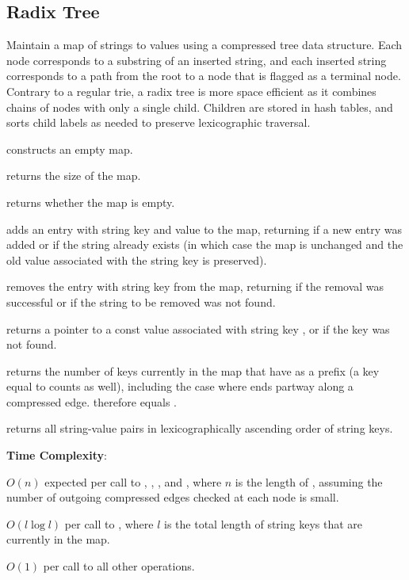 \subsection{Radix Tree}
\label{sec:3.5.2}
Maintain a map of strings to values using a compressed tree data structure. Each node corresponds to a substring of an inserted string, and each inserted string corresponds to a path from the root to a node that is flagged as a terminal node. Contrary to a regular trie, a radix tree is more space efficient as it combines chains of nodes with only a single child. Children are stored in hash tables, and  sorts child labels as needed to preserve lexicographic traversal.

\begin{compactitem}
  \item {} constructs an empty map.
  \item {} returns the size of the map.
  \item {} returns whether the map is empty.
  \item {} adds an entry with string key  and value  to the map, returning  if a new entry was added or  if the string already exists (in which case the map is unchanged and the old value associated with the string key is preserved).
  \item {} removes the entry with string key  from the map, returning  if the removal was successful or  if the string to be removed was not found.
  \item {} returns a pointer to a const value associated with string key , or  if the key was not found.
  \item {} returns the number of keys currently in the map that have  as a prefix (a key equal to  counts as well), including the case where  ends partway along a compressed edge.  therefore equals .
  \item {} returns all string-value pairs in lexicographically ascending order of string keys.
\end{compactitem}

\textbf{Time Complexity}:
\begin{compactitem}
  \item $O(n)$ expected per call to , , , and , where $n$ is the length of , assuming the number of outgoing compressed edges checked at each node is small.
  \item $O(l \log l)$ per call to , where $l$ is the total length of string keys that are currently in the map.
  \item $O(1)$ per call to all other operations.
\end{compactitem}

